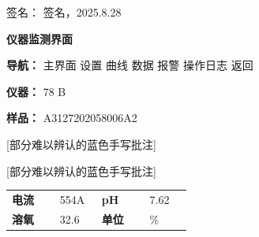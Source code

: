 \documentclass[UTF8,10pt,a4paper,fontset=fandol]{ctexart}
\newcommand{\fieldvalue}[1]{#1}
\newcommand{\handwritten}[1]{#1}
\begin{document}
\vspace{1em}

\noindent
签名：
\fieldvalue{\handwritten{签名，2025.8.28}}

\newpage

\begin{center}
\textbf{仪器监测界面}
\end{center}

\begin{flushleft}
\textbf{导航：}\quad
主界面 \quad 设置 \quad 曲线 \quad 数据 \quad 报警 \quad 操作日志 \quad 返回
\end{flushleft}

\noindent
\textbf{仪器：}
\fieldvalue{78 B}

\medskip

\noindent
\textbf{样品：}
\fieldvalue{A3127202058006A2}

\medskip

\handwritten{[部分难以辨认的蓝色手写批注]}

\handwritten{[部分难以辨认的蓝色手写批注]}

\begin{tabular}{@{}p{0.23\linewidth}p{0.20\linewidth}p{0.23\linewidth}p{0.20\linewidth}@{}}
\textbf{电流} &
\fieldvalue{554A} &
\textbf{pH} &
\fieldvalue{7.62}
\\[1ex]
\textbf{溶氧} &
\fieldvalue{32.6} &
\textbf{单位} &
\% 
\end{tabular}

\medskip

\begin{center}
\end{center}
\end{document}
